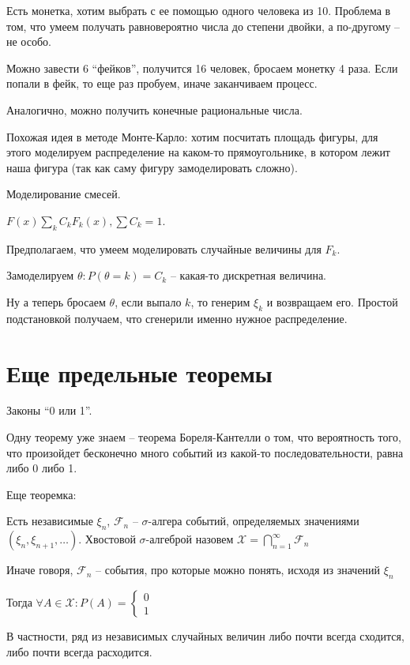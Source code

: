 \begin{exmp}
Есть монетка, хотим выбрать с ее помощью одного человека из 10.
Проблема в том, что умеем получать равновероятно числа до степени двойки, а по-другому -- не особо.

Можно завести 6 ``фейков'', получится 16 человек, бросаем монетку 4 раза. Если попали в фейк, то еще раз пробуем, иначе заканчиваем процесс.

Аналогично, можно получить конечные рациональные числа.
\end{exmp}
\begin{exmp}
Похожая идея в методе Монте-Карло: хотим посчитать площадь фигуры, для этого моделируем распределение на каком-то прямоугольнике, в котором лежит наша фигура (так как саму фигуру замоделировать сложно).
\end{exmp}
\begin{exmp}
Моделирование смесей.

$F(x) \sum\limits_k C_k F_k(x), \sum C_k = 1$.

Предполагаем, что умеем моделировать случайные величины для $F_k$.

Замоделируем $\theta \colon P(\theta = k) = C_k$ -- какая-то дискретная величина.

Ну а теперь бросаем $\theta$, если выпало $k$, то генерим $\xi_k$ и возвращаем его.
Простой подстановкой получаем, что сгенерили именно нужное распределение.
\end{exmp}

\section{Еще предельные теоремы}
Законы ``0 или 1''.

Одну теорему уже знаем -- теорема Бореля-Кантелли о том, что вероятность того, что произойдет бесконечно много событий из какой-то последовательности, равна либо 0 либо 1.

Еще теоремка:
\begin{theorem}
Есть независимые $\xi_n$, $\mathcal{F}_n$ -- $\sigma$-алгера событий, определяемых значениями $(\xi_n,\xi_{n+1}, \dots)$.
Хвостовой $\sigma$-алгеброй назовем $\mathcal{X} = \bigcap\limits_{n=1}^\infty \mathcal{F}_n$

Иначе говоря, $\mathcal{F}_n$ -- события, про которые можно понять, исходя из значений $\xi_n$


Тогда $\forall A \in \mathcal{X} \colon P(A) = \begin{cases} 0 \\ 1 \end{cases}$
\end{theorem}
\begin{exmp}
В частности, ряд из независимых случайных величин либо почти всегда сходится, либо почти всегда расходится.
\end{exmp}

